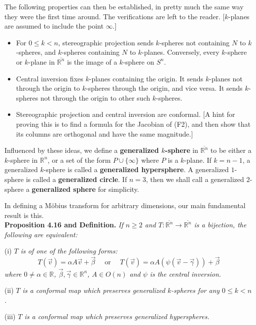 \documentclass[leqno]{book}
\begin{document}
The following properties can then be established, in pretty much the same way they were the first time around.  The verifications are left to the reader.  [$k$-planes are assumed to include the point $\infty$.]
\begin{itemize}
\item For $0\leqslant k<n$, stereographic projection sends $k$-spheres not containing $N$ to $k$-spheres, and $k$-spheres containing $N$ to $k$-planes.  Conversely, every $k$-sphere or $k$-plane in $\overline{\mathbb R^n}$ is the image of a $k$-sphere on $S^n$.

\item Central inversion fixes $k$-planes containing the origin.  It sends $k$-planes not through the origin to $k$-spheres through the origin, and vice versa.  It sends $k$-spheres not through the origin to other such $k$-spheres.

\item Stereographic projection and central inversion are conformal.  [A hint for proving this is to find a formula for the Jacobian of (F2), and then show that its columns are orthogonal and have the same magnitude.]
\end{itemize}
Influenced by these ideas, we define a \textbf{generalized $k$-sphere} in $\overline{\mathbb R^n}$ to be either a $k$-sphere in $\mathbb R^n$, or a set of the form $P\cup\{\infty\}$ where $P$ is a $k$-plane.  If $k=n-1$, a generalized $k$-sphere is called a \textbf{generalized hypersphere}.  A generalized $1$-sphere is called a \textbf{generalized circle}.  If $n=3$, then we shall call a generalized $2$-sphere a \textbf{generalized sphere} for simplicity.

In defining a M\"obius transform for arbitrary dimensions, our main fundamental result is this.\\

\noindent\textbf{Proposition 4.16 and Definition.} \emph{If $n\geqslant 2$ and $T:\overline{\mathbb R^n}\to\overline{\mathbb R^n}$ is a bijection, the following are equivalent:}

(i) \emph{$T$ is of one of the following forms:}
$$T(\vec v)=\alpha A\vec v+\vec\beta\text{~~~~or~~~~}T(\vec v)=\alpha A(\psi(\vec v-\vec\gamma))+\vec\beta$$
\emph{where $0\ne\alpha\in\mathbb R$, $\vec\beta,\vec\gamma\in\mathbb R^n$, $A\in O(n)$ and $\psi$ is the central inversion.}

(ii) \emph{$T$ is a conformal map which preserves generalized $k$-spheres for any $0\leqslant k<n$.}

(iii) \emph{$T$ is a conformal map which preserves generalized hyperspheres.}
\end{document}
